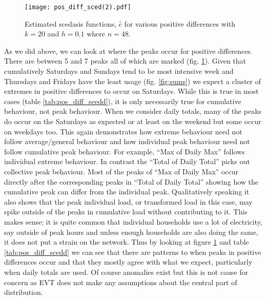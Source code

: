 \begin{figure}
\centering
\texttt{[image: pos\_diff\_sced(2).pdf]}
\caption{\label{fig:pos_diff_sced} Estimated scedasis functions, $\hat{c}$ for various positive differences with $k=20$ and $h=0.1$ where $n=48$.}
\end{figure}

As we did above, we can look at where the peaks occur for positive differences. There are between 5 and 7 peaks all of which are marked (fig. \ref{fig:pos_diff_sced}). %
Given that cumulatively Saturdays and Sundays tend to be most intensive week and Thursdays and Fridays have the least usage (fig. \ref{fig:sums}) we expect a cluster of extremes in positive differences to occur on Saturdays. While this is true in most cases (table \ref{tab:pos_diff_scedd}), it is only necessarily true for cumulative behaviour, not peak behaviour. When we consider daily totals, many of the peaks do occur on the Saturdays as expected or at least on the weekend but some occur on weekdays too. This again demonstrates how extreme behaviour need not follow average/general behaviour and how individual peak behaviour need not follow cumulative peak behaviour. For example, ``Max of Daily Max'' follows individual extreme behaviour. In contrast the ``Total of Daily Total'' picks out collective peak behaviour. Most of the peaks of ``Max of Daily Max'' occur directly after the corresponding peaks in ``Total of Daily Total'' showing how the cumulative peak can differ from the individual peak. Qualitatively speaking it also shows that the peak individual load, or transformed load  in this case, may spike outside of the peaks in cumulative load without contributing to it. This makes sense; it is quite common that individual households use a lot of electricity, say outside of peak hours and unless enough households are also doing the same, it does not put a strain on the network. Thus by looking at figure \ref{fig:pos_diff_sced} and table \ref{tab:pos_diff_scedd} we can see that there are patterns to when peaks in positive differences occur and that they mostly agree with what we expect, particularly when daily totals are used. Of course anomalies exist but this is not cause for concern as EVT does not make any assumptions about the central part of distribution.
